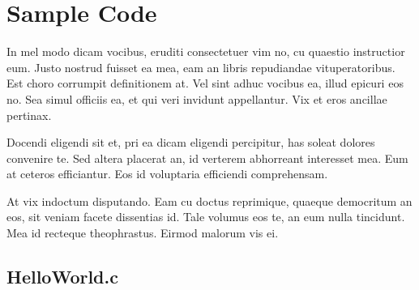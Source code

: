 \cleartooddpage[\thispagestyle{empty}]
\chapter{Sample Code}\label{APPENDIXB}

In mel modo dicam vocibus, eruditi consectetuer vim no, cu quaestio
instructior eum. Justo nostrud fuisset ea mea, eam an libris repudiandae
vituperatoribus. Est choro corrumpit definitionem at. Vel sint adhuc vocibus
ea, illud epicuri eos no. Sea simul officiis ea, et qui veri invidunt
appellantur. Vix et eros ancillae pertinax.

Docendi eligendi sit et, pri ea dicam eligendi percipitur, has soleat
dolores convenire te. Sed altera placerat an, id verterem abhorreant
interesset mea. Eum at ceteros efficiantur. Eos id voluptaria efficiendi
comprehensam.

At vix indoctum disputando. Eam cu doctus reprimique, quaeque democritum
an eos, sit veniam facete dissentias id. Tale volumus eos te, an eum nulla
tincidunt. Mea id recteque theophrastus. Eirmod malorum vis ei.

\section{HelloWorld.c}\label{APPENDIXB_SECTION1}
\renewcommand{\baselinestretch}{1.25}
\lstset{
  language=c
}

\renewcommand{\baselinestretch}{\lineheight}
